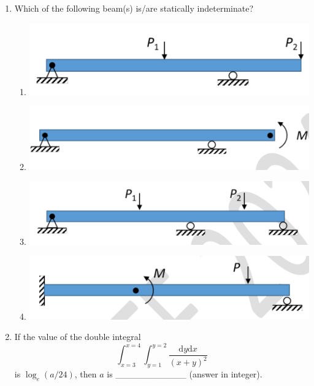 \documentclass[journal,11pt,onecolumn]{IEEEtran}
\begin{document}
\begin{enumerate}[resume]
    \item Which of the following beam(s) is/are statically indeterminate?

          \begin{figure}[H]
              \centering
              \caption{}
              \label{fig:q41}
          \end{figure}

          \begin{enumerate}
              \item \includegraphics[scale=0.2]{o41a}
              \item \includegraphics[scale=0.2]{o41b}
              \item \includegraphics[scale=0.2]{o41c}
              \item \includegraphics[scale=0.2]{o41d}
          \end{enumerate}

    \item If the value of the double integral
          \[
              \int_{x=3}^{x=4} \int_{y=1}^{y=2} \frac{\mathrm{d}y\mathrm{d}x}{(x+y)^2}
          \] is $\log_e(a/24)$, then $a$ is \_\_\_\_\_\_\_\_\_\_\_ (answer in integer).


\end{enumerate}
\end{document}
